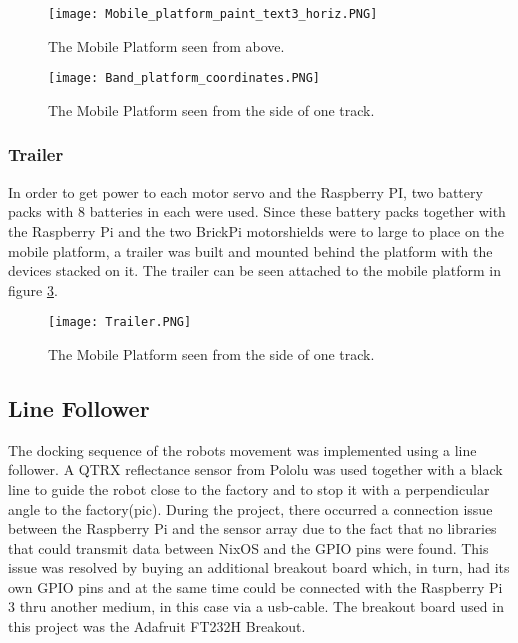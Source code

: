 \begin{figure}[H]
    \centering
    \texttt{[image: Mobile\_platform\_paint\_text3\_horiz.PNG]}
    \caption{The Mobile Platform seen from above.}
    \label{Mobile_platform_paint_}
\end{figure}


\begin{figure}[H]
    \centering
    \texttt{[image: Band\_platform\_coordinates.PNG]}
    \caption{The Mobile Platform seen from the side of one track.}
    \label{Band_platform_coordinates}
\end{figure}

\subsubsection{Trailer}
In order to get power to each motor servo and the Raspberry PI, two battery packs with 8 batteries in each were used. Since these battery packs together with the Raspberry Pi and the two BrickPi motorshields were to large to place on the mobile platform, a trailer was built and mounted behind the platform with the devices stacked on it. The trailer can be seen attached to the mobile platform in figure \ref{Trailer}.

\begin{figure}[H]
    \centering
    \texttt{[image: Trailer.PNG]}
    \caption{The Mobile Platform seen from the side of one track.}
    \label{Trailer}
\end{figure}

\subsection{Line Follower}

The docking sequence of the robots movement was implemented using a line follower. A QTRX reflectance sensor from Pololu was used together with a black line to guide the robot close to the factory and to stop it with a perpendicular angle to the factory(pic). During the project, there occurred a connection issue between the Raspberry Pi and the sensor array due to the fact that no libraries that could transmit data between NixOS and the GPIO pins were found. This issue was resolved by buying an additional breakout board which, in turn, had its own GPIO pins and at the same time could be connected with the Raspberry Pi 3 thru another medium, in this case via a usb-cable. The breakout board used in this project was the Adafruit FT232H Breakout.

